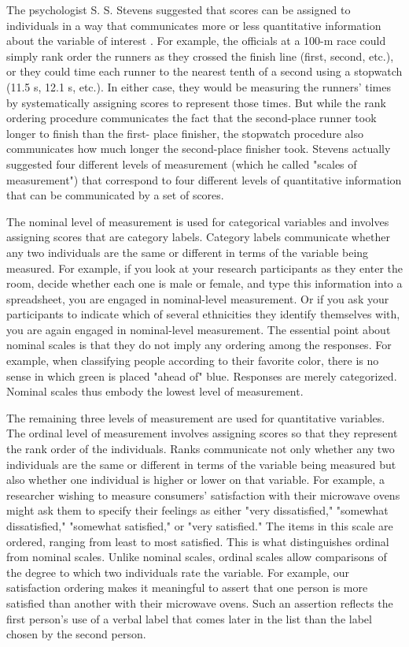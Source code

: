The psychologist S. S. Stevens suggested that scores can be assigned to individuals in a way that communicates more or less quantitative information about the variable of interest \citep{stevens_theory_1946}. For example, the officials at a 100-m race could simply rank order the runners as they crossed the finish line (first, second, etc.), or they could time each runner to the nearest tenth of a second using a stopwatch (11.5 s, 12.1 s, etc.). In either case, they would be measuring the runners' times by systematically assigning scores to represent those times. But while the rank ordering procedure communicates the fact that the second-place runner took longer to finish than the first- place finisher, the stopwatch procedure also communicates how much longer the second-place finisher took. Stevens actually suggested four different levels of measurement (which he called "scales of measurement") that correspond to four different levels of quantitative information that can be communicated by a set of scores.

The nominal level of measurement is used for categorical variables and involves assigning scores that are category labels. Category labels communicate whether any two individuals are the same or different in terms of the variable being measured. For example, if you look at your research participants as they enter the room, decide whether each one is male or female, and type this information into a spreadsheet, you are engaged in nominal-level measurement. Or if you ask your participants to indicate which of several ethnicities they identify themselves with, you are again engaged in nominal-level measurement. The essential point about nominal scales is that they do not imply any ordering among the responses. For example, when classifying people according to their favorite color, there is no sense in which green is placed "ahead of" blue. Responses are merely categorized. Nominal scales thus embody the lowest level of measurement.

The remaining three levels of measurement are used for quantitative variables. The ordinal level of measurement involves assigning scores so that they represent the rank order of the individuals. Ranks communicate not only whether any two individuals are the same or different in terms of the variable being measured but also whether one individual is higher or lower on that variable. For example, a researcher wishing to measure consumers' satisfaction with their microwave ovens might ask them to specify their feelings as either "very dissatisfied," "somewhat dissatisfied," "somewhat satisfied," or "very satisfied." The items in this scale are ordered, ranging from least to most satisfied. This is what distinguishes ordinal from nominal scales. Unlike nominal scales, ordinal scales allow comparisons of the degree to which two individuals rate the variable. For example, our satisfaction ordering makes it meaningful to assert that one person is more satisfied than another with their microwave ovens. Such an assertion reflects the first person's use of a verbal label that comes later in the list than the label chosen by the second person.


